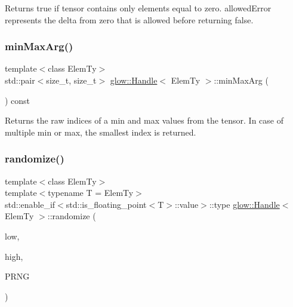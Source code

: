 \begin{DoxyReturn}{Returns}
true if tensor contains only elements equal to zero. {\ttfamily allowed\+Error} represents the delta from zero that is allowed before returning false. 
\end{DoxyReturn}
\mbox{\label{classglow_1_1_handle_ac4004af33a68096e15f642e5e91d954d}} 
\subsubsection{\texorpdfstring{min\+Max\+Arg()}{minMaxArg()}}
{\footnotesize\ttfamily template$<$class Elem\+Ty$>$ \\
std\+::pair$<$size\+\_\+t, size\+\_\+t$>$ \hyperlink{classglow_1_1_handle}{glow\+::\+Handle}$<$ Elem\+Ty $>$\+::min\+Max\+Arg (\begin{DoxyParamCaption}{ }\end{DoxyParamCaption}) const\hspace{0.3cm}{\ttfamily [inline]}}

\begin{DoxyReturn}{Returns}
the raw indices of a min and max values from the tensor. In case of multiple min or max, the smallest index is returned. 
\end{DoxyReturn}
\mbox{\label{classglow_1_1_handle_aba569359ae39c17970cbfba5bbb6fa79}} 
\subsubsection{\texorpdfstring{randomize()}{randomize()}\hspace{0.1cm}{\footnotesize\ttfamily [1/3]}}
{\footnotesize\ttfamily template$<$class Elem\+Ty$>$ \\
template$<$typename T  = Elem\+Ty$>$ \\
std\+::enable\+\_\+if$<$std\+::is\+\_\+floating\+\_\+point$<$T$>$\+::value$>$\+::type \hyperlink{classglow_1_1_handle}{glow\+::\+Handle}$<$ Elem\+Ty $>$\+::randomize (\begin{DoxyParamCaption}\item[{float}]{low,  }\item[{float}]{high,  }\item[{\hyperlink{classglow_1_1_pseudo_r_n_g}{Pseudo\+R\+NG} \&}]{P\+R\+NG }\end{DoxyParamCaption})\hspace{0.3cm}{\ttfamily [inline]}}

